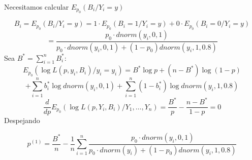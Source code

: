 Necesitamos calcular $E_{p_0}(B_i/Y_i=y)$

\[
B_i=E_{p_0}(B_i/Y_i=y)=1\cdot E_{p_0}(B_i=1/Y_i=y)+0 \cdot E_{p_0}(B_i=0/Y_i=y)
\]
\[
=\frac{p_0 \cdot dnorm(y_i,0,1)}{p_0 \cdot dnorm(y_i,0,1)+(1-p_0)dnorm(y_i,1,0.8)}
\]
Sea $B^*=\sum_{i=1}^{n} B_i^*$:
\[
E_{p_0}(\log L(p,y_i,B_i)/y_i=y_i)=B^* \log p + (n-B^*) \log (1-p) 
\]\[+ \sum_{i=1}^{n} b_i^* \log dnorm(y_i,0,1)
+\sum_{i=1}^{n}(1-b_i^*) \log dnorm(y_i,1,0.8)
\]
\[
\frac{d}{dp} E_{p_0} (\log L(p,Y_i,B_i)/Y_1,\dots,Y_n)=\frac{B^*}{p}-\frac{n-B^*}{1-p}=0
\]
Despejando

\[
p^{(1)}=\frac{B^*}{n}-\frac{1}{n} \sum_{i=1}^{n} \frac{p_0 \cdot dnorm(y_i,0,1)}{p_0 \cdot dnorm(y_i)+(1-p_0)dnorm(y_i,1,0.8)}
\]


